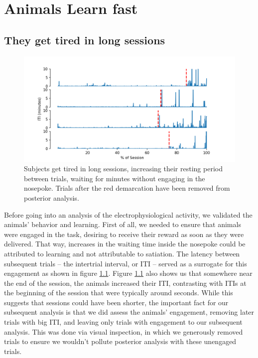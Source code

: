 \chapter{Animals Learn fast}
\label{chap:learning}


\section{They get tired in long sessions}
    \begin{figure}
        \centering
        \includegraphics[width=\textwidth]{figures/iti.png}
        \caption[Subjects get tired in long sessions]{Subjects get tired in long sessions, increasing their resting period between trials, waiting for minutes without engaging in the nosepoke. Trials after the red demarcation have been removed from posterior analysis.}
        \label{fig:iti}
    \end{figure}
    
    Before going into an analysis of the electrophysiological activity, we validated the animals' behavior and learning. First of all, we needed to ensure that animals were engaged in the task, desiring to receive their reward as soon as they were delivered. That way, increases in the waiting time inside the nosepoke could be attributed to learning and not attributable to satiation. The latency between subsequent trials -- the intertrial interval, or ITI --  served as a surrogate for this engagement as shown in figure \ref{fig:iti}. 
    Figure \ref{fig:iti} also shows us that somewhere near the end of the session, the animals increased their ITI, contrasting with ITIs at the beginning of the session that were typically around seconds. While this suggests that sessions could have been shorter, the important fact for our subsequent analysis is that we did assess the animals' engagement, removing later trials with big ITI, and leaving only trials with engagement to our subsequent analysis. This was done via visual inspection, in which we generously removed trials to ensure we wouldn't pollute posterior analysis with these unengaged trials.

